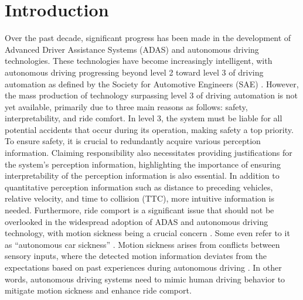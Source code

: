 \section{Introduction}
Over the past decade, significant progress has been made in the development of Advanced Driver Assistance Systems (ADAS) and autonomous driving technologies. 
These technologies have become increasingly intelligent, with autonomous driving progressing beyond level 2 toward level 3 of driving automation as defined by the Society for Automotive Engineers (SAE) \cite{sae20213016}. 
However, the mass production of technology surpassing level 3 of driving automation is not yet available, primarily due to three main reasons as follows: safety, interpretability, and ride comfort.
In level 3, the system must be liable for all potential accidents that occur during its operation, making safety a top priority.
To ensure safety, it is crucial to redundantly acquire various perception information.
Claiming responsibility also necessitates providing justifications for the system's perception information, highlighting the importance of ensuring interpretability of the perception information is also essential.
In addition to quantitative perception information such as distance to preceding vehicles, relative velocity, and time to collision (TTC), more intuitive information is needed.
Furthermore, ride comport is a significant issue that should not be overlooked in the widespread adoption of ADAS and autonomous driving technology, with motion sickness being a crucial concern \cite{diels2016self, iskander2019car}.
Some even refer to it as ``autonomous car sickness'' \cite{iskander2019car}.
Motion sickness arises from conflicts between sensory inputs, where the detected motion information deviates from the expectations based on past experiences during autonomous driving \cite{reason1975motion,reason1978motion}.
In other words, autonomous driving systems need to mimic human driving behavior to mitigate motion sickness and enhance ride comport.

